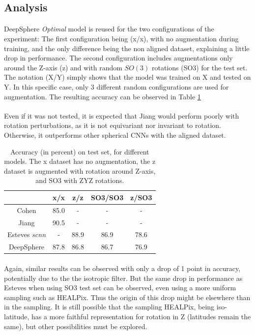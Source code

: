 \documentclass[11pt]{report}
\begin{document}
\subsection{Analysis}
\paragraph*{}
DeepSphere \emph{Optimal} model is reused for the two configurations of the experiment: The first configuration being (x/x), with no augmentation during training, and the only difference being the non aligned dataset, explaining a little drop in performance. The second configuration includes augmentations only around the Z-axis (z) and with random $SO(3)$ rotations (SO3) for the test set. The notation (X/Y) simply shows that the model was trained on X and tested on Y. In this specific case, only 3 different random configurations are used for augmentation.
The resulting accuracy can be observed in Table \ref{tab:mn40_results}

\paragraph*{}
Even if it was not tested, it is expected that Jiang would perform poorly with rotation perturbations, as it is not equivariant nor invariant to rotation. Otherwise, it outperforms other spherical CNNs with the aligned dataset.

\begin{table}[!ht]
    \centering
    \begin{tabular}{c|cccc}
         &  x/x & z/z & SO3/SO3 & z/SO3 \\ \hline
Cohen & 85.0 & - & - & - \\
Jiang & 90.5 & - & - & - \\
Esteves \emph{scnn} & - & 88.9 & 86.9 & 78.6 \\
DeepSphere & 87.8 & 86.8 & 86.7 & 76.9
    \end{tabular}
    \caption{Accuracy (in percent) on test set, for different models. The x dataset has no augmentation, the z dataset is augmented with rotation around Z-axis, and SO3 with ZYZ rotations.}
    \label{tab:mn40_results}
\end{table}

\paragraph*{}
Again, similar results can be observed with only a drop of 1 point in accuracy, potentially due to the the isotropic filter. But the same drop in performance as Esteves when using SO3 test set can be observed, even using a more uniform sampling such as HEALPix. Thus the origin of this drop might be elsewhere than in the sampling. It is still possible that the sampling HEALPix, being iso-latitude, has a more faithful representation for rotation in Z (latitudes remain the same), but other possibilities must be explored.
\end{document}
